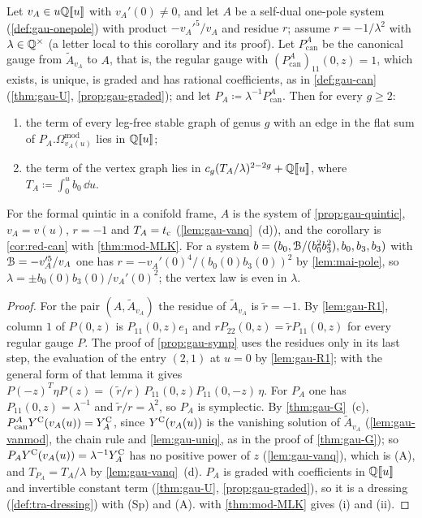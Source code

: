 \begin{cor}
\label{cor:mai-univ}
Let $v_A\in u\mathbb{Q}[\![ u ]\!]$ with $v_A'(0)\neq0$, and let $A$ be a self-dual one-pole system (\cref{def:gau-onepole}) with product $-v_A'^5/v_A$ and residue $r$; assume $r=-1/\lambda^2$ with $\lambda\in\mathbb{Q}^\times$ (a letter local to this corollary and its proof). Let $P^A_{\mathrm{can}}$ be the canonical gauge from $\tilde A_{v_A}$ to $A$, that is, the regular gauge with $(P^A_{\mathrm{can}})_{11}(0,z)=1$, which exists, is unique, is graded and has rational coefficients, as in \cref{def:gau-can} (\cref{thm:gau-U}, \cref{prop:gau-graded}); and let $P_A\coloneqq\lambda^{-1}P^A_{\mathrm{can}}$. Then for every $g\geq2$:
\begin{enumerate}
\item the term of every leg-free stable graph of genus $g$ with an edge in the flat sum of $P_A.\Omega^{\mathrm{mod}}_{v_A(u)}$ lies in $\mathbb{Q}[\![ u ]\!]$;
\item the term of the vertex graph lies in $c_g(T_A/\lambda)^{2-2g}+\mathbb{Q}[\![ u ]\!]$, where $T_A\coloneqq\int_0^ub_0\,\dd u$.
\end{enumerate}
\end{cor}

For the formal quintic in a conifold frame, $A$ is the system of \cref{prop:gau-quintic}, $v_A=v(u)$, $r=-1$ and $T_A=t_{\mathrm{c}}$ (\cref{lem:gau-vanq}~(d)), and the corollary is \cref{cor:red-can} with \cref{thm:mod-MLK}. For a system $b=(b_0,\mathcal{B}/(b_0^2b_3^2),b_0,b_3,b_3)$ with $\mathcal{B}=-v_A'^5/v_A$ one has $r=-v_A'(0)^4/(b_0(0)b_3(0))^2$ by \cref{lem:mai-pole}, so $\lambda=\pm b_0(0)b_3(0)/v_A'(0)^2$; the vertex law is even in $\lambda$.

\begin{proof}
For the pair $(A,\tilde A_{v_A})$ the residue of $\tilde A_{v_A}$ is $\tilde r=-1$. By \cref{lem:gau-R1}, column $1$ of $P(0,z)$ is $P_{11}(0,z)e_1$ and $rP_{22}(0,z)=\tilde rP_{11}(0,z)$ for every regular gauge $P$. The proof of \cref{prop:gau-symp} uses the residues only in its last step, the evaluation of the entry $(2,1)$ at $u=0$ by \cref{lem:gau-R1}; with the general form of that lemma it gives $P(-z)^T\eta P(z)=(\tilde r/r)\,P_{11}(0,z)P_{11}(0,-z)\,\eta$. For $P_A$ one has $P_{11}(0,z)=\lambda^{-1}$ and $\tilde r/r=\lambda^2$, so $P_A$ is symplectic. By \cref{thm:gau-G}~(c), $P^A_{\mathrm{can}}Y^{\mathrm{C}}(v_A(u))=Y^{\mathrm C}_A$, since $Y^{\mathrm{C}}(v_A(u))$ is the vanishing solution of $\tilde A_{v_A}$ (\cref{lem:gau-vanmod}, the chain rule and \cref{lem:gau-uniq}, as in the proof of \cref{thm:gau-G}); so $P_AY^{\mathrm{C}}(v_A(u))=\lambda^{-1}Y^{\mathrm C}_A$ has no positive power of $z$ (\cref{lem:gau-vanq}), which is (A), and $T_{P_A}=T_A/\lambda$ by \cref{lem:gau-vanq}~(d). $P_A$ is graded with coefficients in $\mathbb{Q}[\![ u ]\!]$ and invertible constant term (\cref{thm:gau-U}, \cref{prop:gau-graded}), so it is a dressing (\cref{def:tra-dressing}) with (Sp) and (A).  with \cref{thm:mod-MLK} gives (i) and (ii).
\end{proof}

